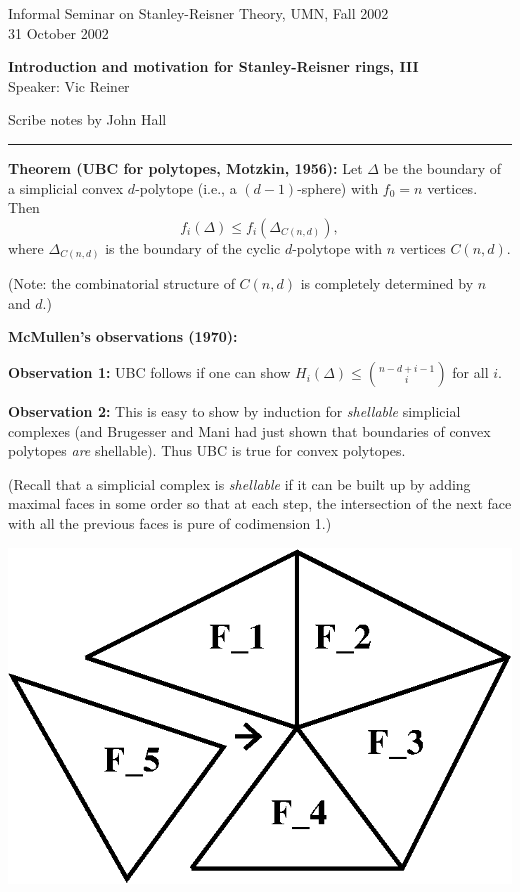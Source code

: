 \documentclass{amsart}
\begin{document}
Informal Seminar on Stanley-Reisner Theory, UMN, Fall 2002 \\
31 October 2002

{\bf Introduction and motivation for Stanley-Reisner rings, III} \\
Speaker: Vic Reiner

Scribe notes by John Hall \\

\hrule

{\bf Theorem (UBC for polytopes, Motzkin, 1956):} Let $\Delta$ be the boundary of a simplicial 
convex $d$-polytope (i.e., a $(d-1)$-sphere) with $f_0=n$ vertices. Then
$$f_i(\Delta) \leq f_i(\Delta_{C(n,d)}),$$
where $\Delta_{C(n,d)}$ is the boundary of the cyclic $d$-polytope
with $n$ vertices $C(n,d)$.

(Note: the combinatorial structure of $C(n,d)$ is completely determined
by $n$ and $d$.)

{\bf McMullen's observations (1970):}

{\bf Observation 1:} UBC follows if one can show $H_i(\Delta) \leq {{n-d+i-1} \choose {i}}$ 
for all $i$.

{\bf Observation 2:} This is easy to show by induction for \emph{shellable} simplicial 
complexes (and Brugesser and Mani had just shown that boundaries of 
convex polytopes \emph{are} shellable). Thus UBC is true for convex polytopes.

(Recall that a simplicial complex is \emph{shellable} if it can be built up 
by adding maximal faces in some order so that at each step, the 
intersection of the next face with all the previous faces is pure of 
codimension 1.)

\begin{center}
\includegraphics[totalheight=1in]{vic3fig1}
\end{center}
\end{document}
